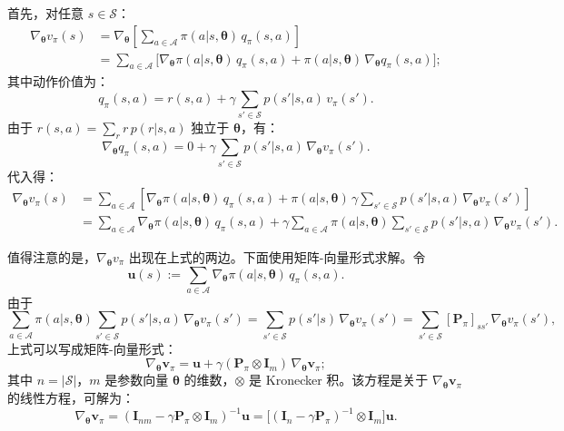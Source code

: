 \documentclass[UTF8]{article}
\begin{document}
\begin{proofbox}
首先，对任意 $s \in \mathcal{S}$：
\begin{align*}
\nabla_{\boldsymbol{\theta}} v_\pi(s) &= \nabla_{\boldsymbol{\theta}} \left[ \sum_{a \in \mathcal{A}} \pi(a|s, \boldsymbol{\theta}) \, q_\pi(s,a) \right] \\
&= \sum_{a \in \mathcal{A}} \bigl[ \nabla_{\boldsymbol{\theta}} \pi(a|s, \boldsymbol{\theta}) \, q_\pi(s,a) + \pi(a|s, \boldsymbol{\theta}) \, \nabla_{\boldsymbol{\theta}} q_\pi(s,a) \bigr];
\end{align*}
其中动作价值为：
\[
q_\pi(s,a) = r(s,a) + \gamma \sum_{s' \in \mathcal{S}} p(s'|s,a) \, v_\pi(s').
\]
由于 $r(s,a) = \sum_{r} r \, p(r|s,a)$ 独立于 $\boldsymbol{\theta}$，有：
\[
\nabla_{\boldsymbol{\theta}} q_\pi(s,a) = 0 + \gamma \sum_{s' \in \mathcal{S}} p(s'|s,a) \, \nabla_{\boldsymbol{\theta}} v_\pi(s').
\]
代入得：
\begin{align*}
\nabla_{\boldsymbol{\theta}} v_\pi(s) &= \sum_{a \in \mathcal{A}} \left[ \nabla_{\boldsymbol{\theta}} \pi(a|s, \boldsymbol{\theta}) \, q_\pi(s,a) + \pi(a|s, \boldsymbol{\theta}) \, \gamma \sum_{s' \in \mathcal{S}} p(s'|s,a) \, \nabla_{\boldsymbol{\theta}} v_\pi(s') \right] \\
&= \sum_{a \in \mathcal{A}} \nabla_{\boldsymbol{\theta}} \pi(a|s, \boldsymbol{\theta}) \, q_\pi(s,a) + \gamma \sum_{a \in \mathcal{A}} \pi(a|s, \boldsymbol{\theta}) \sum_{s' \in \mathcal{S}} p(s'|s,a) \, \nabla_{\boldsymbol{\theta}} v_\pi(s').
\end{align*}

值得注意的是，$\nabla_{\boldsymbol{\theta}} v_\pi$ 出现在上式的两边。下面使用矩阵-向量形式求解。令
\[
\boldsymbol{u}(s) := \sum_{a \in \mathcal{A}} \nabla_{\boldsymbol{\theta}} \pi(a|s, \boldsymbol{\theta}) \, q_\pi(s,a).
\]
由于
\[
\sum_{a \in \mathcal{A}} \pi(a|s, \boldsymbol{\theta}) \sum_{s' \in \mathcal{S}} p(s'|s,a) \, \nabla_{\boldsymbol{\theta}} v_\pi(s') = \sum_{s' \in \mathcal{S}} p(s'|s) \, \nabla_{\boldsymbol{\theta}} v_\pi(s') = \sum_{s' \in \mathcal{S}} [\boldsymbol{P}_\pi]_{ss'} \, \nabla_{\boldsymbol{\theta}} v_\pi(s'),
\]
上式可以写成矩阵-向量形式：
\[
\nabla_{\boldsymbol{\theta}} \boldsymbol{v}_\pi = \boldsymbol{u} + \gamma (\boldsymbol{P}_\pi \otimes \boldsymbol{I}_m) \, \nabla_{\boldsymbol{\theta}} \boldsymbol{v}_\pi;
\]
其中 $n = |\mathcal{S}|$，$m$ 是参数向量 $\boldsymbol{\theta}$ 的维数，$\otimes$ 是 Kronecker 积。该方程是关于 $\nabla_{\boldsymbol{\theta}} \boldsymbol{v}_\pi$ 的线性方程，可解为：
\[
\nabla_{\boldsymbol{\theta}} \boldsymbol{v}_\pi = (\boldsymbol{I}_{nm} - \gamma \boldsymbol{P}_\pi \otimes \boldsymbol{I}_m)^{-1} \boldsymbol{u} = \bigl[ (\boldsymbol{I}_n - \gamma \boldsymbol{P}_\pi)^{-1} \otimes \boldsymbol{I}_m \bigr] \boldsymbol{u}.
\]


\end{proofbox}
\end{document}

